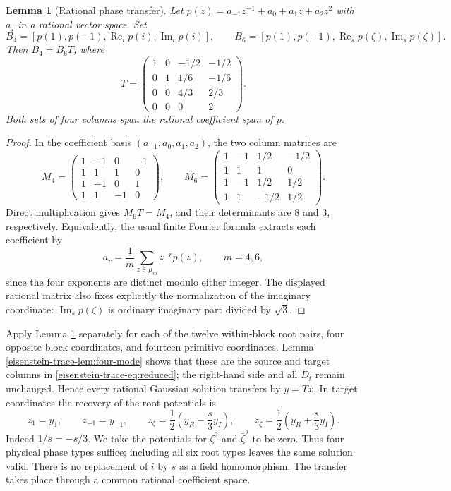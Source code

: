 \documentclass[11pt]{article}
\newtheorem{lemma}[theorem]{Lemma}
\theoremstyle{definition}
\theoremstyle{remark}
\newcommand{\Ree}{\operatorname{Re}_s}
\newcommand{\Imm}{\operatorname{Im}_s}
\begin{document}
\begin{lemma}[Rational phase transfer]\label{eisenstein-trace-lem:transfer}
Let $p(z)=a_{-1}z^{-1}+a_0+a_1z+a_2z^2$ with $a_j$ in a rational
vector space.  Set
\[
 B_4=[p(1),p(-1),\operatorname{Re}_i p(i),\operatorname{Im}_i p(i)],
 \qquad
 B_6=[p(1),p(-1),\Ree p(\zeta),\Imm p(\zeta)].
\]
Then $B_4=B_6T$, where
\begin{equation}\label{eisenstein-trace-eq:T}
 T=\begin{pmatrix}
 1&0&-1/2&-1/2\\
 0&1&1/6&-1/6\\
 0&0&4/3&2/3\\
 0&0&0&2
 \end{pmatrix}.
\end{equation}
Both sets of four columns span the rational coefficient span of $p$.
\end{lemma}
\begin{proof}
In the coefficient basis $(a_{-1},a_0,a_1,a_2)$, the two column
matrices are
\[
 M_4=\begin{pmatrix}1&-1&0&-1\\1&1&1&0\\1&-1&0&1\\1&1&-1&0\end{pmatrix},
 \qquad
 M_6=\begin{pmatrix}
 1&-1&1/2&-1/2\\1&1&1&0\\1&-1&1/2&1/2\\1&1&-1/2&1/2
 \end{pmatrix}.
\]
Direct multiplication gives $M_6T=M_4$, and their determinants are
$8$ and $3$, respectively.  Equivalently, the usual finite Fourier
formula extracts each coefficient by
\[
 a_r=\frac1m\sum_{z\in\mu_m}z^{-r}p(z),\qquad m=4,6,
\]
since the four exponents are distinct modulo either integer.
The displayed rational matrix also fixes explicitly the normalization
of the imaginary coordinate: $\Imm p(\zeta)$ is ordinary imaginary
part divided by $\sqrt3$.
\end{proof}

Apply Lemma \ref{eisenstein-trace-lem:transfer} separately for each of the twelve
within-block root pairs, four opposite-block coordinates, and fourteen
primitive coordinates.  Lemma \ref{eisenstein-trace-lem:four-mode} shows that these
are the source and target columns in \eqref{eisenstein-trace-eq:reduced};
the right-hand side and all $D_t$ remain unchanged.  Hence every
rational Gaussian solution transfers by $y=Tx$.  In target
coordinates the recovery of the root potentials is
\begin{equation}\label{eisenstein-trace-eq:recover}
 z_1=y_1,\qquad z_{-1}=y_{-1},\qquad
 z_\zeta=\frac12\left(y_R-\frac{s}{3}y_I\right),\qquad
 z_{\bar\zeta}=\frac12\left(y_R+\frac{s}{3}y_I\right).
\end{equation}
Indeed $1/s=-s/3$.  We take the potentials for $\zeta^2$ and
$\bar\zeta^2$ to be zero.  Thus four physical phase types suffice;
including all six root types leaves the same solution valid.
There is no replacement of $i$ by $s$ as a field homomorphism.
The transfer takes place through a common rational coefficient space.
\end{document}
